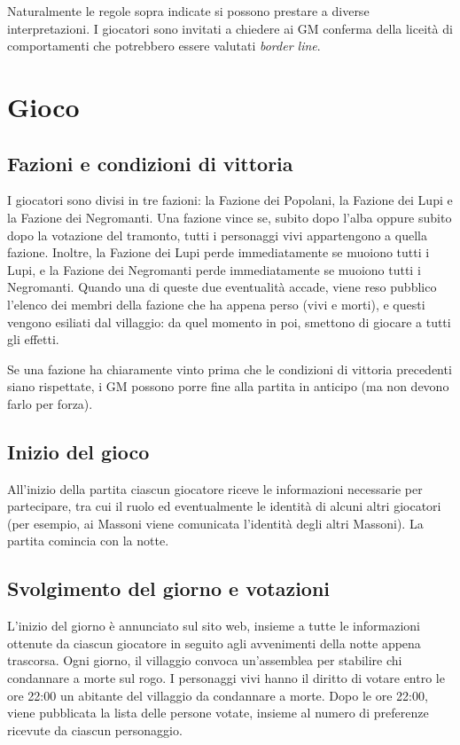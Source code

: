 \documentclass[a4paper,10pt]{article}
\begin{document}
Naturalmente le regole sopra indicate si possono prestare a diverse interpretazioni. I giocatori sono invitati a chiedere ai GM conferma della liceità di comportamenti che potrebbero essere valutati \emph{border line}.
\pagebreak

\section{Gioco}

\subsection{Fazioni e condizioni di vittoria}

I giocatori sono divisi in tre fazioni: la Fazione dei Popolani, la Fazione dei Lupi e la Fazione dei Negromanti. Una fazione vince se, subito dopo l'alba oppure subito dopo la votazione del tramonto, tutti i personaggi vivi appartengono a quella fazione. Inoltre, la Fazione dei Lupi perde immediatamente se muoiono tutti i Lupi, e la Fazione dei Negromanti perde immediatamente se muoiono tutti i Negromanti. Quando una di queste due eventualità accade, viene reso pubblico l'elenco dei membri della fazione che ha appena perso (vivi e morti), e questi vengono esiliati dal villaggio: da quel momento in poi, smettono di giocare a tutti gli effetti.

Se una fazione ha chiaramente vinto prima che le condizioni di vittoria precedenti siano rispettate, i GM possono porre fine alla partita in anticipo (ma non devono farlo per forza).

\subsection{Inizio del gioco}

All'inizio della partita ciascun giocatore riceve le informazioni necessarie per partecipare, tra cui il ruolo ed eventualmente le identità di alcuni altri giocatori (per esempio, ai Massoni viene comunicata l'identità degli altri Massoni). La partita comincia con la notte.

\subsection{Svolgimento del giorno e votazioni} %

L'inizio del giorno è annunciato sul sito web, insieme a tutte le informazioni ottenute da ciascun giocatore in seguito agli avvenimenti della notte appena trascorsa. Ogni giorno, il villaggio convoca un'assemblea per stabilire chi condannare a morte sul rogo. I personaggi vivi hanno il diritto di votare entro le ore 22:00 un abitante del villaggio da condannare a morte. Dopo le ore 22:00, viene pubblicata la lista delle persone votate, insieme al numero di preferenze ricevute da ciascun personaggio.
\end{document}
